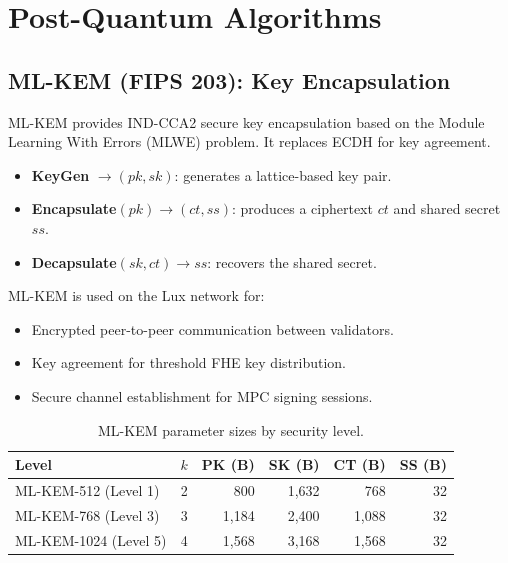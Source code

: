 \section{Post-Quantum Algorithms}

\label{sec:algorithms}

\subsection{ML-KEM (FIPS 203): Key Encapsulation}

\begin{definition}
ML-KEM provides IND-CCA2 secure key encapsulation based on the
Module Learning With Errors (MLWE) problem.  It replaces ECDH for
key agreement.

\begin{itemize}[nosep]
  \item \textbf{KeyGen} $\rightarrow (pk, sk)$: generates a lattice-based
        key pair.
  \item \textbf{Encapsulate}$(pk) \rightarrow (ct, ss)$: produces a
        ciphertext $ct$ and shared secret $ss$.
  \item \textbf{Decapsulate}$(sk, ct) \rightarrow ss$: recovers the
        shared secret.
\end{itemize}
\end{definition}

ML-KEM is used on the Lux network for:
\begin{itemize}[nosep]
  \item Encrypted peer-to-peer communication between validators.
  \item Key agreement for threshold FHE key distribution.
  \item Secure channel establishment for MPC signing sessions.
\end{itemize}

\begin{table}[h]
\centering
\begin{tabular}{lrrrrr}
\toprule
\textbf{Level} & \textbf{$k$} & \textbf{PK (B)} & \textbf{SK (B)} &
\textbf{CT (B)} & \textbf{SS (B)} \\
\midrule
ML-KEM-512  (Level 1) & 2 & 800  & 1,632 & 768  & 32 \\
ML-KEM-768  (Level 3) & 3 & 1,184 & 2,400 & 1,088 & 32 \\
ML-KEM-1024 (Level 5) & 4 & 1,568 & 3,168 & 1,568 & 32 \\
\bottomrule
\end{tabular}
\caption{ML-KEM parameter sizes by security level.}
\label{tab:mlkem-sizes}
\end{table}

